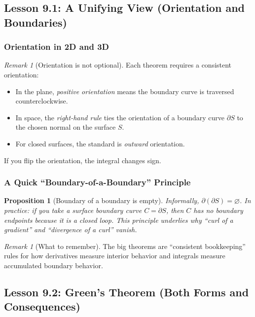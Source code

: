 \documentclass[12pt]{article}
\numberwithin{equation}{section}
\theoremstyle{plain}
\newtheorem{proposition}[theorem]{Proposition}
\theoremstyle{definition}
\theoremstyle{remark}
\newtheorem{remark}[theorem]{Remark}
\begin{document}
\subsection{Lesson 9.1: A Unifying View (Orientation and Boundaries)}

\subsubsection{Orientation in 2D and 3D}

\begin{remark}[Orientation is not optional]
Each theorem requires a consistent orientation:
\begin{itemize}
\item In the plane, \emph{positive orientation} means the boundary curve is traversed counterclockwise.
\item In space, the \emph{right-hand rule} ties the orientation of a boundary curve $\partial S$ to the chosen normal on the surface $S$.
\item For closed surfaces, the standard is \emph{outward} orientation.
\end{itemize}
If you flip the orientation, the integral changes sign.
\end{remark}

\subsubsection{A Quick “Boundary-of-a-Boundary” Principle}

\begin{proposition}[Boundary of a boundary is empty]\label{prop:boundary-boundary}
Informally, $\partial(\partial S)=\varnothing$.
In practice: if you take a surface boundary curve $C=\partial S$, then $C$ has no boundary endpoints because it is a closed loop.
This principle underlies why “curl of a gradient” and “divergence of a curl” vanish.
\end{proposition}

\begin{remark}[What to remember]
The big theorems are “consistent bookkeeping” rules for how derivatives measure interior behavior and integrals measure accumulated boundary behavior.
\end{remark}

\subsection{Lesson 9.2: Green's Theorem (Both Forms and Consequences)}
\end{document}
